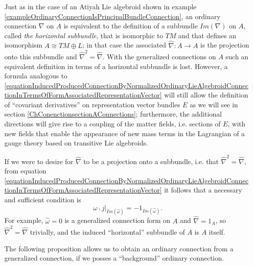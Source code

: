 \begin{remark}
Just as in the case of an Atiyah Lie algebroid shown in example \ref{exampleOrdinaryConnectionIsPrincipalBundleConnection}, an ordinary connection $\nabla$ on $A$ is equivalent to the definition of a subbundle $Im(\nabla)$ on $A$, called \emph{the horizontal subbundle}, that is isomorphic to $TM$ and that defines an isomorphism $A \cong TM \oplus L$; in that case the associated $\hat \nabla: A \to A$ is the projection onto this subbundle and $\hat \nabla^2 = \hat \nabla$. With the generalized connections on $A$ such an equivalent definition in terms of a horizontal subbundle is lost. However, a formula analogous to \eqref{equationInducedProducedConnectionByNormalizedOrdinaryLieAlgebroidConnectionInTermsOfFormAssociatedRepresentationVector} will still allow the definition of ``covariant derivatives'' on representation vector bundles $E$ as we will see in section \ref{ChConenctionsectionAConnections}; furthermore, the additional directions will give rise to a coupling of the matter fields, i.e. sections of $E$, with new fields that enable the appearance of new mass terms in the Lagrangian of a gauge theory based on transitive Lie algebroids.

If we were to desire for $\hat \nabla$ to be a projection onto a subbundle, i.e. that $\hat \nabla^2 = \hat \nabla$, from equation \eqref{equationInducedProducedConnectionByNormalizedOrdinaryLieAlgebroidConnectionInTermsOfFormAssociatedRepresentationVector} it follows that a necessary and sufficient condition is 
\begin{equation}\label{equationEquivalentNecessarySufficientGeneralizedConnectionBeDefineHorizontalProjectionSubbundle}
    \omega \comp j|_{Im(\hat \omega)} = - 1_{Im(\hat \omega)}.
\end{equation}
For example, $\hat \omega = 0$ is a generalized connection form on $A$ and $\hat \nabla = 1_A$, so $\hat \nabla^2 = \hat \nabla$ trivially, and the induced ``horizontal'' subbundle of $A$ is $A$ itself.
\end{remark}

The following proposition allows us to obtain an ordinary connection from a generalized connection, if we posses a ``background'' ordinary connection.


